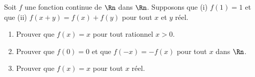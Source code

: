 
\begin{exercice}\label{exo0034}

Soit $f$ une fonction continue de $\Rn$ dans $\Rn$. Supposons que (i) $f(1)=1$ et que (ii) $f(x+y)=f(x)+f(y)$ pour tout $x$ et $y$ réel.
\begin{enumerate}
	\item Prouver que $f(x)=x$ pour tout rationnel $x>0$.
	\item Prouver que $f(0)=0$ et que $f(-x)=-f(x)$ pour tout $x$ dans $\Rn$.
	\item Prouver que $f(x)=x$ pour tout $x$ réel.
\end{enumerate}

\end{exercice}
